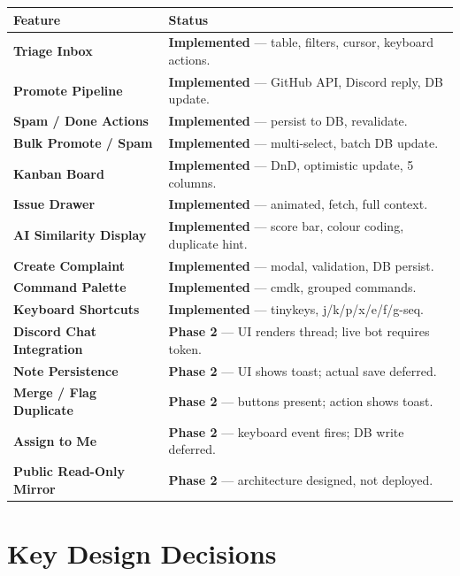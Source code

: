 \documentclass[12pt,a4paper]{report}
\begin{document}
\begin{longtable}{>{\bfseries}p{4cm} p{9cm}}
\toprule
Feature & Status \\
\midrule
\endhead
Triage Inbox & \textcolor{success!80!black}{\textbf{Implemented}} --- table, filters, cursor, keyboard actions. \\
Promote Pipeline & \textcolor{success!80!black}{\textbf{Implemented}} --- GitHub API, Discord reply, DB update. \\
Spam / Done Actions & \textcolor{success!80!black}{\textbf{Implemented}} --- persist to DB, revalidate. \\
Bulk Promote / Spam & \textcolor{success!80!black}{\textbf{Implemented}} --- multi-select, batch DB update. \\
Kanban Board & \textcolor{success!80!black}{\textbf{Implemented}} --- DnD, optimistic update, 5 columns. \\
Issue Drawer & \textcolor{success!80!black}{\textbf{Implemented}} --- animated, fetch, full context. \\
AI Similarity Display & \textcolor{success!80!black}{\textbf{Implemented}} --- score bar, colour coding, duplicate hint. \\
Create Complaint & \textcolor{success!80!black}{\textbf{Implemented}} --- modal, validation, DB persist. \\
Command Palette & \textcolor{success!80!black}{\textbf{Implemented}} --- cmdk, grouped commands. \\
Keyboard Shortcuts & \textcolor{success!80!black}{\textbf{Implemented}} --- tinykeys, j/k/p/x/e/f/g-seq. \\
Discord Chat Integration & \textcolor{warning!80!black}{\textbf{Phase 2}} --- UI renders thread; live bot requires token. \\
Note Persistence & \textcolor{warning!80!black}{\textbf{Phase 2}} --- UI shows toast; actual save deferred. \\
Merge / Flag Duplicate & \textcolor{warning!80!black}{\textbf{Phase 2}} --- buttons present; action shows toast. \\
Assign to Me & \textcolor{warning!80!black}{\textbf{Phase 2}} --- keyboard event fires; DB write deferred. \\
Public Read-Only Mirror & \textcolor{warning!80!black}{\textbf{Phase 2}} --- architecture designed, not deployed. \\
\bottomrule
\end{longtable}

\section{Key Design Decisions}
\end{document}
